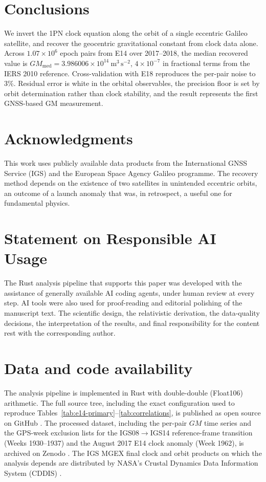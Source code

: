 \documentclass[11pt,a4paper]{article}
\begin{document}
\section{Conclusions}

We invert the 1PN clock equation along the orbit of a single eccentric Galileo satellite, and recover the geocentric gravitational constant from clock data alone. Across $1.07 \times 10^{6}$ epoch pairs from E14 over 2017--2018, the median recovered value is $GM_\text{med} = 3.986006 \times 10^{14}~\mathrm{m^3\,s^{-2}}$, $4 \times 10^{-7}$ in fractional terms from the IERS 2010 reference. Cross-validation with E18 reproduces the per-pair noise to 3\%. Residual error is white in the orbital observables, the precision floor is set by orbit determination rather than clock stability, and the result represents the first GNSS-based GM measurement.

\section*{Acknowledgments}

This work uses publicly available data products from the International GNSS Service (IGS) and the European Space Agency Galileo programme. The recovery method depends on the existence of two satellites in unintended eccentric orbits, an outcome of a launch anomaly that was, in retrospect, a useful one for fundamental physics.

\section*{Statement on Responsible AI Usage}

The Rust analysis pipeline that supports this paper was developed with the assistance of generally available AI coding agents, under human review at every step. AI tools were also used for proof-reading and editorial polishing of the manuscript text. The scientific design, the relativistic derivation, the data-quality decisions, the interpretation of the results, and final responsibility for the content rest with the corresponding author.

\section*{Data and code availability}

The analysis pipeline is implemented in Rust with double-double (Float106) arithmetic. The full source tree, including the exact configuration used to reproduce Tables~\ref{tab:e14-primary}--\ref{tab:correlations}, is published as open source on GitHub \citep{HansenCode2026}. The processed dataset, including the per-pair $GM$ time series and the GPS-week exclusion lists for the IGS08$\to$IGS14 reference-frame transition (Weeks 1930--1937) and the August 2017 E14 clock anomaly (Week 1962), is archived on Zenodo \citep{HansenData2026}. The IGS MGEX final clock and orbit products on which the analysis depends are distributed by NASA's Crustal Dynamics Data Information System (CDDIS) \citep{CDDIS_MGEX, Noll2010}.
\end{document}
